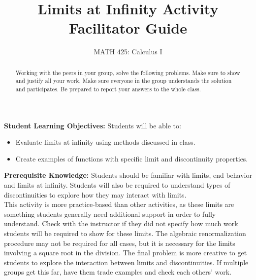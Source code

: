 \documentclass{ximera}
\title{Limits at Infinity Activity Facilitator Guide}
\author{MATH 425: Calculus I}
\begin{document}
\begin{abstract}
    Working with the peers in your group, solve the following problems. Make sure to show and justify all your work. Make sure everyone in the group understands the solution and participates. Be prepared to report your answers to the whole class. 
\end{abstract}
\maketitle

\textbf{Student Learning Objectives:}
Students will be able to:
\begin{itemize}
    \item Evaluate limits at infinity using methods discussed in class.
    \item Create examples of functions with specific limit and discontinuity properties.
\end{itemize}

\textbf{Prerequisite Knowledge:} Students should be familiar with limits, end behavior and limits at infinity.  Students will also be required to understand types of discontinuities to explore how they may interact with limits.\\

This activity is more practice-based than other activities, as these limits are something students generally need additional support in order to fully understand.  Check with the instructor if they did not specify how much work students will be required to show for these limits.  The algebraic renormalization procedure may not be required for all cases, but it is necessary for the limits involving a square root in the division.  The final problem is more creative to get students to explore the interaction between limits and discontinuities.  If multiple groups get this far, have them trade examples and check each others' work.  
\end{document}
